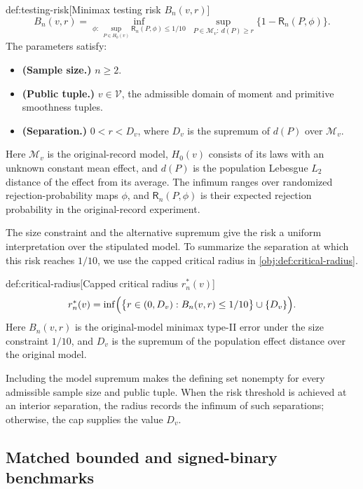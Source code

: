 \documentclass[11pt]{article}
\begin{document}
\begin{definitionv}{def:testing-risk}[Minimax testing risk $B_n(v,r)$]
\[
B_n(v,r)=
\inf_{\phi:\ \sup_{P\in H_0(v)}\mathsf R_n(P,\phi)\le 1/10}
\ \sup_{P\in\mathcal M_v:\ d(P)\ge r}
\bigl\{1-\mathsf R_n(P,\phi)\bigr\}.
\]
The parameters satisfy:
\begin{itemize}
\item \textbf{(Sample size.)} \(n\ge 2\).
\item \textbf{(Public tuple.)} \(v\in\mathcal V\), the admissible domain of moment and primitive smoothness tuples.
\item \textbf{(Separation.)} \(0<r<D_v\), where \(D_v\) is the supremum of \(d(P)\) over \(\mathcal M_v\).
\end{itemize}
Here \(\mathcal M_v\) is the original-record model, \(H_0(v)\) consists of its laws with an unknown constant mean effect, and \(d(P)\) is the population Lebesgue \(L_2\) distance of the effect from its average. The infimum ranges over randomized rejection-probability maps \(\phi\), and \(\mathsf R_n(P,\phi)\) is their expected rejection probability in the original-record experiment.
\end{definitionv}

The size constraint and the alternative supremum give the risk a uniform interpretation over the stipulated model. To summarize the separation at which this risk reaches \(1/10\), we use the capped critical radius  in \cref{obj:def:critical-radius}.

\begin{definitionv}{def:critical-radius}[Capped critical radius $r_n^*(v)$]
\[
r_n^*(v)=
\inf\Bigl(
\bigl\{r\in(0,D_v):B_n(v,r)\le 1/10\bigr\}
\cup\{D_v\}
\Bigr).
\]
Here \(B_n(v,r)\) is the original-model minimax type-II error under the size constraint \(1/10\), and \(D_v\) is the supremum of the population effect distance over the original model.
\end{definitionv}

Including the model supremum makes the defining set nonempty for every admissible sample size and public tuple. When the risk threshold is achieved at an interior separation, the radius records the infimum of such separations; otherwise, the cap supplies the value \(D_v\).

\subsection{Matched bounded and signed-binary benchmarks}
\end{document}
